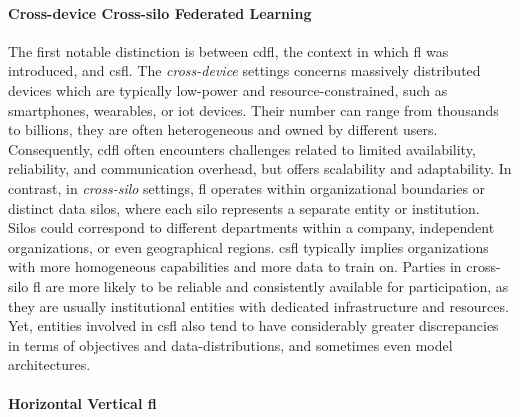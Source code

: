 \paragraph{Cross-device \vs Cross-silo Federated Learning}

The first notable distinction is between \gls{cdfl}, the context in which \gls{fl} was introduced, and \gls{csfl}.
The \emph{cross-device} settings concerns massively distributed devices which are typically low-power and resource-constrained, such as smartphones, wearables, or \gls{iot} devices.
Their number can range from thousands to billions, they are often heterogeneous and owned by different users.
Consequently, \gls{cdfl} often encounters challenges related to limited availability, reliability, and communication overhead, but offers scalability and adaptability.
In contrast, in \emph{cross-silo} settings, \gls{fl} operates within organizational boundaries or distinct data silos, where each silo represents a separate entity or institution.
Silos could correspond to different departments within a company, independent organizations, or even geographical regions.
\gls{csfl} typically implies organizations with more homogeneous capabilities and more data to train on.
Parties in cross-silo \gls{fl} are more likely to be reliable and consistently available for participation, as they are usually institutional entities with dedicated infrastructure and resources.
Yet, entities involved in \gls{csfl} also tend to have considerably greater discrepancies in terms of objectives and data-distributions, and sometimes even model architectures.


\paragraph{Horizontal \vs Vertical \gls{fl}}

